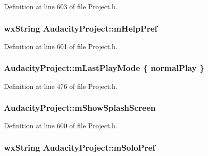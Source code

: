 Definition at line 603 of file Project.\+h.

\subsubsection[{\texorpdfstring{m\+Help\+Pref}{mHelpPref}}]{\setlength{\rightskip}{0pt plus 5cm}wx\+String Audacity\+Project\+::m\+Help\+Pref}\hypertarget{class_audacity_project_a151dd4034c1375241e5a9016d2431c77}{}\label{class_audacity_project_a151dd4034c1375241e5a9016d2431c77}


Definition at line 601 of file Project.\+h.

\subsubsection[{\texorpdfstring{m\+Last\+Play\+Mode}{mLastPlayMode}}]{ Audacity\+Project\+::m\+Last\+Play\+Mode \{ {\bf normal\+Play} \}}\hypertarget{class_audacity_project_a2d83eeb120fa6b141d0343a1a8792c96}{}\label{class_audacity_project_a2d83eeb120fa6b141d0343a1a8792c96}


Definition at line 476 of file Project.\+h.

\subsubsection[{\texorpdfstring{m\+Show\+Splash\+Screen}{mShowSplashScreen}}]{ Audacity\+Project\+::m\+Show\+Splash\+Screen}\hypertarget{class_audacity_project_a90a9ba27847b89218615939c29affb15}{}\label{class_audacity_project_a90a9ba27847b89218615939c29affb15}


Definition at line 600 of file Project.\+h.

\subsubsection[{\texorpdfstring{m\+Solo\+Pref}{mSoloPref}}]{\setlength{\rightskip}{0pt plus 5cm}wx\+String Audacity\+Project\+::m\+Solo\+Pref}\hypertarget{class_audacity_project_accfaa03f2aa99ac25b64a502b1495a78}{}\label{class_audacity_project_accfaa03f2aa99ac25b64a502b1495a78}


